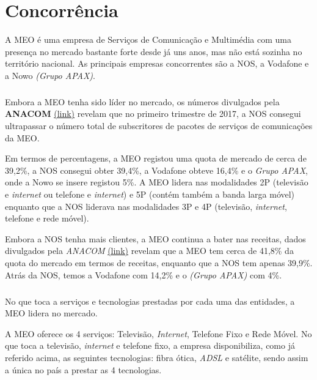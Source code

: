 \documentclass{report}
\begin{document}
\chapter{Concorrência}
\label{chap.concorrência}


A MEO é uma empresa de Serviços de Comunicação e Multimédia com uma presença no mercado bastante forte desde já uns anos, mas não está sozinha no território nacional. As principais empresas concorrentes são a NOS, a Vodafone e a Nowo \textit{(Grupo APAX)}. 

\paragraph{}
	Embora a MEO tenha sido líder no mercado, os números divulgados pela \textbf{ANACOM} \href{https://www.anacom.pt/streaming/PacotesServicos1T17_final.pdf?contentId=1410761&field=ATTACHED_FILE}{(link)} revelam que no primeiro trimestre de 2017, a NOS consegui ultrapassar o número total de subscritores de pacotes de serviços de comunicações da MEO. 
	
	Em termos de percentagens, a MEO registou uma quota de mercado de cerca de 39,2\%, a NOS consegui obter 39,4\%, a Vodafone obteve 16,4\% e o \textit{Grupo APAX}, onde a Nowo se insere registou 5\%. A MEO lidera nas modalidades 2P (televisão e \textit{internet} ou telefone e \textit{internet}) e 5P (contém também a banda larga móvel) enquanto que a NOS liderava nas modalidades 3P e 4P (televisão, \textit{internet}, telefone e rede móvel).
	 
	Embora a NOS tenha mais clientes, a MEO continua a bater nas receitas, dados divulgados pela \textit{ANACOM} \href{https://www.anacom.pt/streaming/PacotesServicos1T17_final.pdf?contentId=1410761&field=ATTACHED_FILE}{(link)} revelam que a MEO tem cerca de 41,8\% da quota do mercado em termos de receitas, enquanto que a NOS tem apenas 39,9\%. Atrás da NOS, temos a Vodafone com 14,2\% e o \textit{(Grupo APAX)} com 4\%.

\paragraph{}	
	No que toca a serviços e tecnologias prestadas por cada uma das entidades, a MEO lidera no mercado.
	
	A MEO oferece os 4 serviços: Televisão, \textit{Internet}, Telefone Fixo e Rede Móvel. No que toca a televisão, \textit{internet} e telefone fixo, a empresa disponibiliza, como já referido acima, as seguintes tecnologias: fibra ótica, \textit{ADSL} e satélite, sendo assim a única no país a prestar as 4 tecnologias.
	
\end{document}
